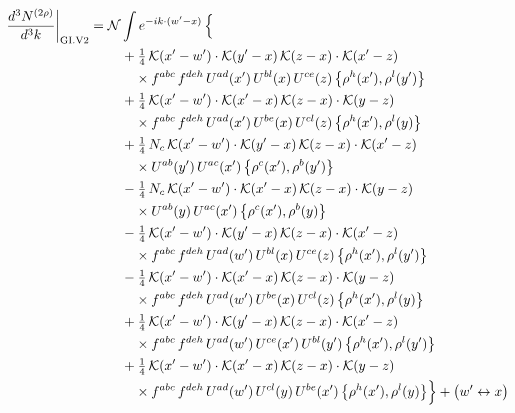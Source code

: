 \documentclass[10pt]{article}
\numberwithin{equation}{section}
\newcommand{\KK}{\mathcal K}
\newcommand{\NN}{\mathcal N}
\begin{document}
\begin{align}
\frac{d^3N^{(2\rho)}}{d^3k}\bigg|_{\rm GI.V2}={}&\NN\int e^{-ik\cdot(w'-x)}\,\Big\{\notag\\
&\quad +\tfrac14\,\KK(x'-w')\cdot\KK(y'-x)\,\KK(z-x)\cdot\KK(x'-z)\notag\\
&\qquad\times f^{abc}\,f^{deh}\,U^{ad}(x')\,U^{bl}(x)\,U^{ce}(z)\,\big\{\rho^{h}(x'),\rho^{l}(y')\big\}\notag\\
&\quad +\tfrac14\,\KK(x'-w')\cdot\KK(x'-x)\,\KK(z-x)\cdot\KK(y-z)\notag\\
&\qquad\times f^{abc}\,f^{deh}\,U^{ad}(x')\,U^{be}(x)\,U^{cl}(z)\,\big\{\rho^{h}(x'),\rho^{l}(y)\big\}\notag\\
&\quad +\tfrac14\,N_{c}\,\KK(x'-w')\cdot\KK(y'-x)\,\KK(z-x)\cdot\KK(x'-z)\notag\\
&\qquad\times U^{ab}(y')\,U^{ac}(x')\,\big\{\rho^{c}(x'),\rho^{b}(y')\big\}\notag\\
&\quad -\tfrac14\,N_{c}\,\KK(x'-w')\cdot\KK(x'-x)\,\KK(z-x)\cdot\KK(y-z)\notag\\
&\qquad\times U^{ab}(y)\,U^{ac}(x')\,\big\{\rho^{c}(x'),\rho^{b}(y)\big\}\notag\\
&\quad -\tfrac14\,\KK(x'-w')\cdot\KK(y'-x)\,\KK(z-x)\cdot\KK(x'-z)\notag\\
&\qquad\times f^{abc}\,f^{deh}\,U^{ad}(w')\,U^{bl}(x)\,U^{ce}(z)\,\big\{\rho^{h}(x'),\rho^{l}(y')\big\}\notag\\
&\quad -\tfrac14\,\KK(x'-w')\cdot\KK(x'-x)\,\KK(z-x)\cdot\KK(y-z)\notag\\
&\qquad\times f^{abc}\,f^{deh}\,U^{ad}(w')\,U^{be}(x)\,U^{cl}(z)\,\big\{\rho^{h}(x'),\rho^{l}(y)\big\}\notag\\
&\quad +\tfrac14\,\KK(x'-w')\cdot\KK(y'-x)\,\KK(z-x)\cdot\KK(x'-z)\notag\\
&\qquad\times f^{abc}\,f^{deh}\,U^{ad}(w')\,U^{ce}(x')\,U^{bl}(y')\,\big\{\rho^{h}(x'),\rho^{l}(y')\big\}\notag\\
&\quad +\tfrac14\,\KK(x'-w')\cdot\KK(x'-x)\,\KK(z-x)\cdot\KK(y-z)\notag\\
&\qquad\times f^{abc}\,f^{deh}\,U^{ad}(w')\,U^{cl}(y)\,U^{be}(x')\,\big\{\rho^{h}(x'),\rho^{l}(y)\big\}\Big\}+\big(w'\leftrightarrow x\big)\label{eq:sum-GI.V2}
\end{align}
\end{document}
